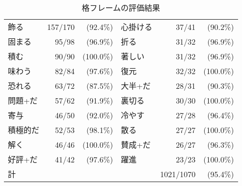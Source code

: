 \documentclass[fleqn]{nlp}
\begin{document}
\begin{table}
 \begin{center}
 \caption{格フレームの評価結果}
 \label{Evaluation::CF}
 \begin{tabular}{lr@{ }r|lr@{ }r} \hline
  飾る & 157/170 & (92.4\%) & 心掛ける & 37/41 & (90.2\%) \\
  固まる & 95/98 & (96.9\%) & 折る & 31/32 & (96.9\%) \\
  積む & 90/90 & (100.0\%) & 著しい & 31/32 & (96.9\%) \\
  味わう & 82/84 & (97.6\%) & 復元 & 32/32 & (100.0\%) \\
  恐れる & 63/72 & (87.5\%) & 大半+だ & 28/31 & (90.3\%) \\
  問題+だ & 57/62 & (91.9\%) & 裏切る & 30/30 & (100.0\%) \\
  寄与 & 46/50 & (92.0\%) & 冷やす & 27/28 & (96.4\%) \\
  積極的だ & 52/53 & (98.1\%) & 散る & 27/27 & (100.0\%) \\
  解く & 46/46 & (100.0\%) & 賛成+だ & 26/27 & (96.3\%) \\
  好評+だ & 41/42 & (97.6\%) & 躍進 & 23/23 & (100.0\%)\\ \hline
  計 & & \multicolumn{1}{r}{} & & 1021/1070 & (95.4\%) \\ \hline
 \end{tabular}
 \end{center}
\end{table}
\end{document}
